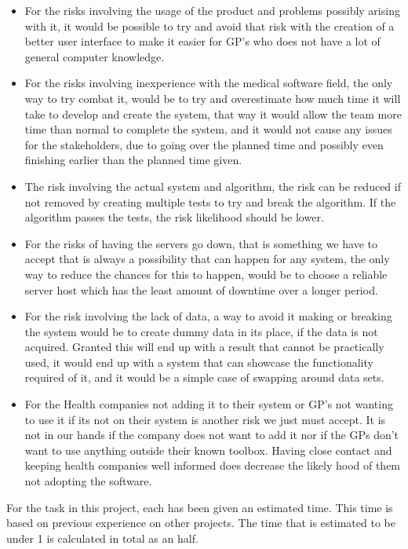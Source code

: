 \begin{itemize}
	\item For the risks involving the usage of the product and problems possibly arising with it, it would be possible to try and avoid that risk with the creation of a better user interface to make it easier for GP’s who does not have a lot of general computer knowledge. 
	\item For the risks involving inexperience with the medical software field, the only way to try combat it, would be to try and overestimate how much time it will take to develop and create the system, that way it would allow the team more time than normal to complete the system, and it would not cause any issues for the stakeholders, due to going over the planned time and possibly even finishing earlier than the planned time given.
	\item The risk involving the actual system and algorithm, the risk can be reduced if not removed by creating multiple tests to try and break the algorithm. If the algorithm passes the tests, the risk likelihood should be lower.
	\item For the risks of having the servers go down, that is something we have to accept that is always a possibility that can happen for any system, the only way to reduce the chances for this to happen, would be to choose a reliable server host which has the least amount of downtime over a longer period.
	\item For the risk involving the lack of data, a way to avoid it making or breaking the system would be to create dummy data in its place, if the data is not acquired. Granted this will end up with a result that cannot be practically used, it would end up with a system that can showcase the functionality required of it, and it would be a simple case of swapping around data sets.
	\item For the Health companies not adding it to their system or GP’s not wanting to use it if its not on their system is another risk we just must accept. It is not in our hands if the company does not want to add it nor if the GPs don’t want to use anything outside their known toolbox. Having close contact and keeping health companies well informed does decrease the likely hood of them not adopting the software.
\end{itemize}
\pagebreak
For the task in this project, each has been given an estimated time. This time is based on previous experience on other projects. The time that is estimated to be under 1 is calculated in total as an half.


